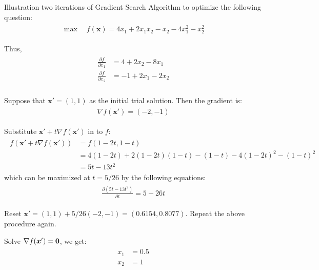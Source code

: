 \documentclass[fleqn,10pt]{wlscirep}
\begin{document}
Illustration two iterations of Gradient Search Algorithm to optimize the following question:
\begin{align} \begin{split}
    \max \quad f(\boldsymbol{x}) = 4 x_{1} + 2 x_{1} x_{2} - x_{2} - 4 x_{1}^{2} - x_{2}^{2}
\end{split} \end{align} 

Thus,
\begin{align} \begin{split}
    \frac{\partial f}{\partial x_{1}} &= 4 + 2 x_{2} - 8 x_{1} \\
    \frac{\partial f}{\partial x_{2}} &= -1 + 2 x_{1} - 2 x_{2} \\
\end{split} \end{align} 

Suppose that $\boldsymbol{x}' = (1, 1)$ as the initial trial solution. Then the gradient is:
\begin{align} \begin{split}
    \nabla f(\boldsymbol{x}') = (- 2, -1)
\end{split} \end{align} 

Substitute $\boldsymbol{x}' + t \nabla f(\boldsymbol{x}')$ in to $f$:
\begin{align} \begin{split}
    f(\boldsymbol{x}' + t \nabla f(\boldsymbol{x}')) &= f(1 - 2t, 1 - t) \\
    &= 4 (1 - 2t) + 2 (1 - 2t) (1 - t) - (1 - t) - 4 (1 - 2t)^{2} - (1 - t)^{2} \\
    &= 5 t - 13 t^2
\end{split} \end{align} 
which can be maximized at $t = 5 / 26$ by the following equations:
\begin{align} \begin{split}
    \frac{\partial (5 t - 13 t^2)}{\partial t} = 5 - 26 t
\end{split} \end{align} 

Reset $\boldsymbol{x}' = (1, 1) + 5 / 26 (-2, -1) = (0.6154, 0.8077)$. Repeat the above procedure again.

Solve $\nabla f(\boldsymbol{x}') = \bold{0}$, we get:
\begin{align} \begin{split}
    x_{1} &= 0.5 \\
    x_{2} &= 1
\end{split} \end{align} 
\end{document}
